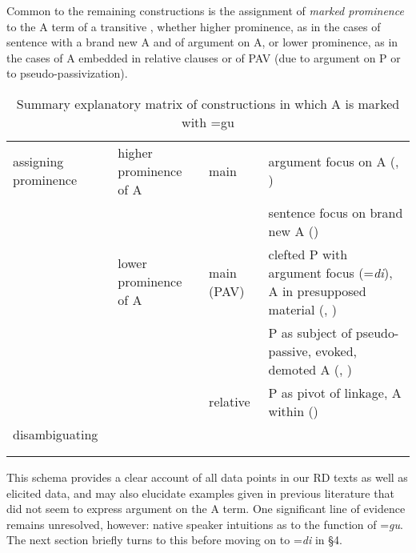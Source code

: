 \documentclass[output=paper,modfonts]{langscibook}
\begin{document}
Common to the remaining constructions is the assignment of \textit{marked prominence} to the A term of a transitive , whether higher prominence, as in the cases of sentence  with a brand new A and of argument  on A, or lower prominence, as in the cases of A embedded in relative clauses or of PAV  (due to argument  on P or to pseudo-passivization).


\begin{table}
 \small
\begin{tabularx}{\textwidth}{p{2cm}>{\raggedright}p{2.4cm}lQ}
\lsptoprule
assigning prominence & higher prominence of A & main & argument  {focus} on A (, )\\
&  &  & sentence  {focus} on brand new A ()\\
\tablevspace
& {lower prominence of A} & main (PAV) & clefted P with argument  {focus} (=\textit{di}), A in presupposed material (, )\\
\tablevspace
&  &  & P as subject of pseudo-{passive}, 
evoked, demoted A (, )\\
\tablevspace
\tablevspace
&  & relative & P as pivot of  linkage,
A within  ()\\
disambiguating & \\
& \\
\lspbottomrule
\end{tabularx}
\caption{Summary explanatory matrix of constructions in which A is marked with =gu}
\label{tab:wolfe:1}
\end{table}

\newpage 
This schema provides a clear account of all data points in our RD texts as well as elicited data, and may also elucidate examples given in previous literature that did not seem to express argument  on the A term. One significant line of evidence remains unresolved, however: native speaker intuitions as to the function of =\textit{gu}. The next section briefly turns to this before moving on to =\textit{di} in §4.
\end{document}
